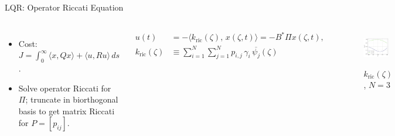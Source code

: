 \documentclass[8pt]{beamer}
\begin{document}
\begin{frame}{LQR: Operator Riccati Equation}
\begin{columns}[t]

\begin{itemize}
  \item Cost: $J=\int_0^\infty \langle x,{Q}x\rangle + \langle u,{R}u\rangle\,ds$.
  \item Solve operator Riccati for ${\Pi}$; truncate in biorthogonal basis to get matrix Riccati for $P=[p_{ij}]$.
\end{itemize}
\small
\begin{align*}
u(t) &= -\langle k_{\mathrm{ric}}(\zeta),\,x(\zeta,t)\rangle
= -{B}^* {\Pi}x(\zeta,t),\\
k_{\mathrm{ric}}(\zeta) &\equiv \sum_{i=1}^{N}\sum_{j=1}^{N} p_{i,j}\,\gamma_i\,\overline{\psi_j}(\zeta)
\end{align*}
\begin{figure}
    \centering
    \includegraphics[width=0.85\textwidth]{figures/k_3.png}\\[-1em]
    \caption{$k_{\mathrm{ric}}(\zeta)$, $N{=}3$}
\end{figure}
\end{columns}

\end{frame}
\end{document}

